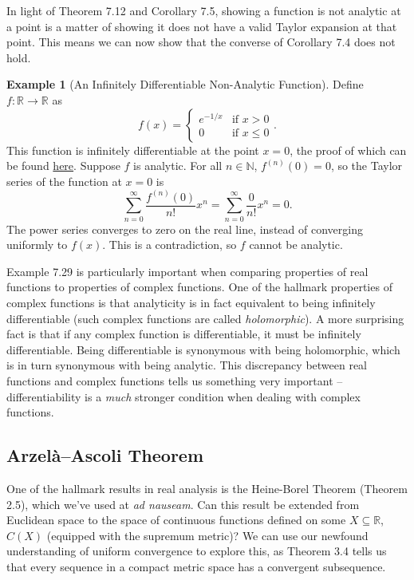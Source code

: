 \documentclass{article}
\newcommand{\N}{\mathbb{N}}
\newcommand{\R}{\mathbb{R}}
\theoremstyle{definition}
\newtheorem{example}{Example}[section]
\begin{document}
	In light of Theorem 7.12 and Corollary 7.5, showing a function is not analytic at a point is a matter of showing it does not have a valid Taylor expansion at that point. This means we can now show that the converse of Corollary 7.4 does not hold.
	\begin{example}[An Infinitely Differentiable Non-Analytic Function]
		Define $ f:\R\to\R $ as $$ f(x) =\begin{cases}
			e^{-1/x} &\text{if }x>0\\
			0&\text{if } x\le 0
		\end{cases}. $$
		This function is infinitely differentiable at the point $ x = 0 $, the proof of which can be found \href{https://en.wikipedia.org/wiki/Non-analytic_smooth_function}{here}. Suppose $ f $ is analytic. For all $ n\in \N $, $ f^{(n)}(0)=0 $, so the Taylor series of the function at $ x = 0 $ is 
		$$ \sum_{n=0}^{\infty}\frac{f^{(n)}(0)}{n!}x^n = \sum_{n=0}^{\infty}\frac{0}{n!}x^n = 0.$$
		The power series converges to zero on the real line, instead of converging uniformly to $ f(x) $. This is a contradiction, so $ f $ cannot be analytic.
	\end{example}
	
	Example 7.29 is particularly important when comparing properties of real functions to properties of complex functions. One of the hallmark properties of complex functions is that analyticity is in fact equivalent to being infinitely differentiable (such complex functions are called \textit{\color{red}holomorphic}). A more surprising fact is that if any complex function is differentiable, it must be infinitely differentiable. Being differentiable is synonymous with being holomorphic, which is in turn synonymous with being analytic. This discrepancy between real functions and complex functions tells us something very important -- differentiability is a \textit{much} stronger condition when dealing with complex functions. 
	
	\subsection{Arzelà–Ascoli Theorem}
	
	
	One of the hallmark results in real analysis is the Heine-Borel Theorem (Theorem 2.5), which we've used at \textit{ad nauseam}. Can this result be extended from Euclidean space to the space of continuous functions defined on some $X\subseteq\R$, $C(X)$ (equipped with the supremum metric)? We can use our newfound understanding of uniform convergence to explore this, as Theorem 3.4 tells us that every sequence in a compact metric space has a convergent subsequence.
	
\end{document}
